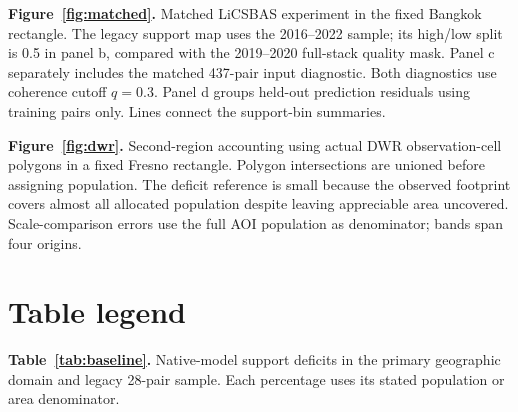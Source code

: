\documentclass[pdflatex,lineno,sn-nature]{sn-jnl}
\begin{document}
\noindent\textbf{Figure~\ref{fig:matched}.} Matched LiCSBAS experiment in the fixed Bangkok rectangle. The legacy support map uses the 2016--2022 sample; its high/low split is 0.5 in panel b, compared with the 2019--2020 full-stack quality mask. Panel c separately includes the matched 437-pair input diagnostic. Both diagnostics use coherence cutoff $q=0.3$. Panel d groups held-out prediction residuals using training pairs only. Lines connect the support-bin summaries.

\noindent\textbf{Figure~\ref{fig:dwr}.} Second-region accounting using actual DWR observation-cell polygons in a fixed Fresno rectangle. Polygon intersections are unioned before assigning population. The deficit reference is small because the observed footprint covers almost all allocated population despite leaving appreciable area uncovered. Scale-comparison errors use the full AOI population as denominator; bands span four origins.

\section*{Table legend}
\noindent\textbf{Table~\ref{tab:baseline}.} Native-model support deficits in the primary geographic domain and legacy 28-pair sample. Each percentage uses its stated population or area denominator.
\end{document}
